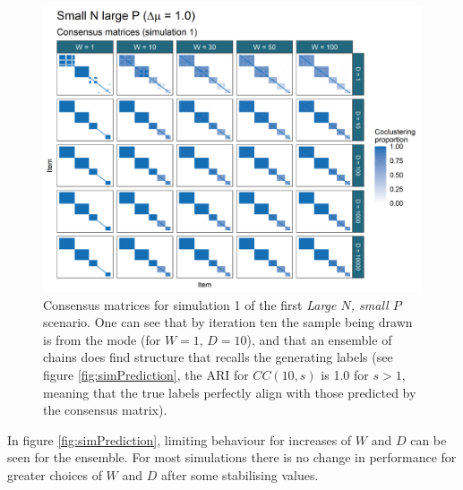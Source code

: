 \documentclass[]{article}
\begin{document}
\begin{figure} %
	\centering
	\includegraphics[scale=0.65]{./Images/Simulations/CMs/small_n_large_p_baseSim1.png}
	\caption{Consensus matrices for simulation 1 of the first \emph{Large $N$, small $P$} scenario. One can see that by iteration ten the sample being drawn is from the mode (for $W=1$, $D = 10$), and that an ensemble of chains does find structure that recalls the generating labels (see figure \ref{fig:simPrediction}, the ARI for $CC(10, s)$ is 1.0 for $s > 1$, meaning that the true labels perfectly align with those predicted by the consensus matrix).}
	\label{fig:simSmallNLargePCMs}
\end{figure}

In figure \ref{fig:simPrediction}, limiting behaviour for increases of $W$ and $D$ can be seen for the ensemble. For most simulations there is no change in performance for greater choices of $W$ and $D$ after some stabilising values.
\end{document}
